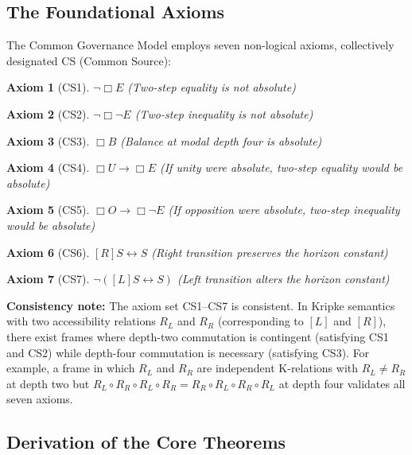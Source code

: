 \documentclass[11pt,a4paper]{article}
\newtheorem{axiom}{Axiom}
\theoremstyle{definition}
\theoremstyle{remark}
\begin{document}
\subsection{The Foundational Axioms}

The Common Governance Model employs seven non-logical axioms, collectively designated CS (Common Source):

\begin{axiom}[CS1]
$\neg\Box E$ \quad (Two-step equality is not absolute)
\end{axiom}

\begin{axiom}[CS2]
$\neg\Box\neg E$ \quad (Two-step inequality is not absolute)
\end{axiom}

\begin{axiom}[CS3]
$\Box B$ \quad (Balance at modal depth four is absolute)
\end{axiom}

\begin{axiom}[CS4]
$\Box U \to \Box E$ \quad (If unity were absolute, two-step equality would be absolute)
\end{axiom}

\begin{axiom}[CS5]
$\Box O \to \Box\neg E$ \quad (If opposition were absolute, two-step inequality would be absolute)
\end{axiom}

\begin{axiom}[CS6]
$[R]S \leftrightarrow S$ \quad (Right transition preserves the horizon constant)
\end{axiom}

\begin{axiom}[CS7]
$\neg([L]S \leftrightarrow S)$ \quad (Left transition alters the horizon constant)
\end{axiom}

\textbf{Consistency note:} The axiom set CS1--CS7 is consistent. In Kripke semantics \cite{Kripke1963} with two accessibility relations $R_L$ and $R_R$ (corresponding to $[L]$ and $[R]$), there exist frames where depth-two commutation is contingent (satisfying CS1 and CS2) while depth-four commutation is necessary (satisfying CS3). For example, a frame in which $R_L$ and $R_R$ are independent K-relations with $R_L \neq R_R$ at depth two but $R_L \circ R_R \circ R_L \circ R_R = R_R \circ R_L \circ R_R \circ R_L$ at depth four validates all seven axioms.

\subsection{Derivation of the Core Theorems}
\end{document}
